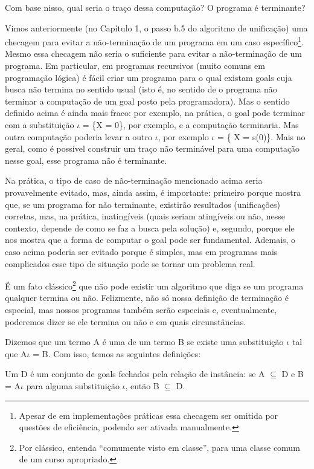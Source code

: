\documentclass{article}
\begin{document}
Com base nisso, qual seria o traço dessa computação?
O programa é terminante?

Vimos anteriormente (no Capítulo 1, o passo b.5 do algoritmo de unificação) %
uma checagem para evitar a não-terminação de um programa em um caso específico\footnote{Apesar de em implementações práticas essa checagem ser omitida por questões de eficiência, podendo ser ativada manualmente.}.
Mesmo essa checagem não seria o suficiente para evitar a não-terminação de um programa.
Em particular, em programas recursivos (muito comuns em programação lógica) é fácil criar um programa para o qual existam goals cuja busca não termina no sentido usual (isto é, no sentido de o programa não terminar a computação de um goal posto pela programadora).
Mas o sentido definido acima é ainda mais fraco: por exemplo, na prática, o goal  pode terminar com a substituição $\iota$ = \{X = 0\}, por exemplo, e a computação terminaria. Mas outra computação poderia
levar a outro $\iota$, por exemplo $\iota$ = \{ X = s(0)\}. Mais no geral, como é possível construir um traço não terminável para uma computação nesse goal, esse programa não é terminante.

Na prática, o tipo de caso de não-terminação mencionado acima seria provavelmente evitado, mas, ainda assim, é importante: primeiro porque mostra que, se um programa for não terminante, existirão resultados (unificações) corretas, mas, na prática, inatingíveis (quais seriam atingíveis ou não, nesse contexto, depende de como se faz a busca pela solução) e, segundo, porque ele nos mostra que a forma de computar o goal pode ser fundamental. Ademais, o caso acima poderia ser evitado porque é simples, mas em programas mais complicados esse tipo de situação pode se tornar um problema real.

É um fato clássico\footnote{Por clássico, entenda ``comumente visto em classe'', para uma classe comum de um curso apropriado.} que não pode existir um algoritmo que diga se um programa qualquer termina ou não. Felizmente, não só nossa definição de terminação é especial, mas nossos programas também serão especiais e, eventualmente, poderemos dizer se ele termina ou não e em quais circunstâncias.

Dizemos que um termo A é uma  de um termo B se existe uma substituição $\iota$ tal que A$\iota$ = B. Com isso, temos as seguintes definições:

\begin{definition}
  Um  D é um conjunto de goals fechados pela relação de instância: se A $\subseteq$ D e B = A$\iota$ para alguma substituição $\iota$, então B $\subseteq$ D.
  \end{definition}
\end{document}
